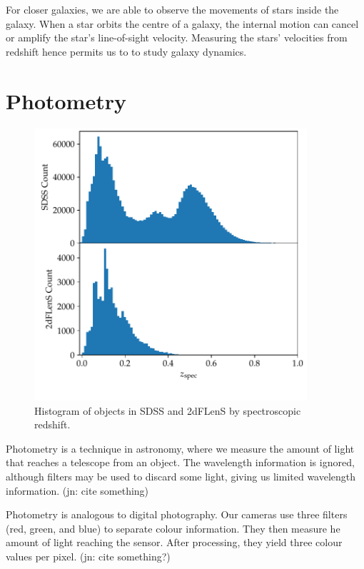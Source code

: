 \documentclass[11pt,twoside,openright]{report}
\newcommand\jn[1]{{\color{red}(jn: #1)}}
\begin{document}
  For closer galaxies, we are able to observe the movements of stars inside the galaxy. When a star orbits the centre of a galaxy, the internal motion can cancel or amplify the star's line-of-sight velocity. Measuring the stars' velocities from redshift hence permits us to to study galaxy dynamics.

\chapter{Photometry}

  \begin{figure}
    \centering
    \includegraphics[width=0.9\textwidth]{zpec_hist.pdf}
    \caption{Histogram of objects in SDSS and 2dFLenS by spectroscopic redshift.}
    \label{fig:spec_hist}
  \end{figure}

  Photometry is a technique in astronomy, where we measure the amount of light that reaches a telescope from an object. The wavelength information is ignored, although filters may be used to discard some light, giving us limited wavelength information. \jn{cite something}

  Photometry is analogous to digital photography. Our cameras use three filters (red, green, and blue) to separate colour information. They then measure he amount of light reaching the sensor. After processing, they yield three colour values per pixel. \jn{cite something?}
\end{document}
